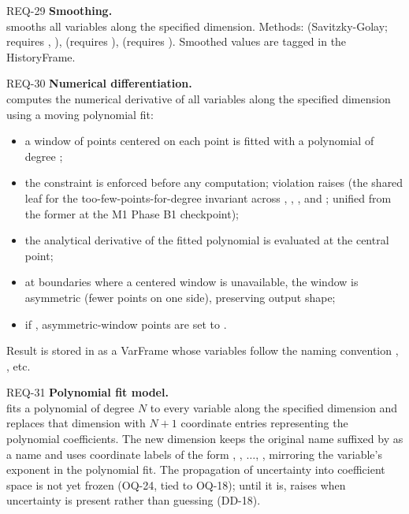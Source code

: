 \begin{reqbox}{REQ-29}{\stable}
\textbf{Smoothing.}\\
 smooths all variables
along the specified dimension. Methods:  (Savitzky-Golay;
requires , ),  (requires
),  (requires ). Smoothed
values are tagged  in the HistoryFrame.
\end{reqbox}

\begin{reqbox}{REQ-30}{\stable}
\textbf{Numerical differentiation.}\\
 computes the
numerical derivative of all variables along the specified dimension using
a moving polynomial fit:
\begin{itemize}[noitemsep,topsep=2pt]
  \item a window of  points centered on each point is fitted
    with a polynomial of degree ;
  \item the constraint  is enforced before any
    computation; violation raises  (the shared
    leaf for the too-few-points-for-degree invariant across
    , , , and
    ; unified from the former  at
    the M1 Phase B1 checkpoint);
  \item the analytical derivative of the fitted polynomial is evaluated at
    the central point;
  \item at boundaries where a centered window is unavailable, the window
    is asymmetric (fewer points on one side), preserving output shape;
  \item if , asymmetric-window points are set to
    .
\end{itemize}
Result is stored in  as a VarFrame whose variables follow
the naming convention , , etc.
\end{reqbox}

\begin{reqbox}{REQ-31}{\stable}
\textbf{Polynomial fit model.}\\
 fits a polynomial of
degree $N$ to every variable along the specified dimension and replaces
that dimension with $N+1$ coordinate entries representing the polynomial
coefficients. The new dimension keeps the original name suffixed by
 as a name and uses coordinate labels of the form
, , $\dots$, , mirroring
the variable's exponent in the polynomial fit. The propagation of
uncertainty into coefficient space is not yet frozen (OQ-24, tied to
OQ-18); until it is,  raises when uncertainty is
present rather than guessing (DD-18).
\end{reqbox}

